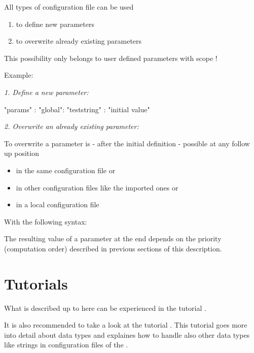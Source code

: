 All types of configuration file can be used

\begin{enumerate}
   \item to define new parameters
   \item to overwrite already existing parameters
\end{enumerate}

This possibility only belongs to user defined parameters with scope !

\vspace{2ex}

Example:

\textit{1. Define a new parameter:}

\begin{pythoncode}
"params" : {
            "global": {
                       "teststring" : "initial value"
                      }
           }
\end{pythoncode}

\vspace{2ex}

\textit{2. Overwrite an already existing parameter:}

To overwrite a parameter is - after the initial definition - possible at any follow up position

\begin{itemize}
   \item in the same configuration file or
   \item in other configuration files like the imported ones or
   \item in a local configuration file
\end{itemize}

With the following syntax:


The resulting value of a parameter at the end depends on the priority (computation order) described in previous sections of this description.

\newpage

\section{Tutorials}

What is described up to here can be experienced in the tutorial .

It is also recommended to take a look at the tutorial .
This tutorial goes more into detail about data types and explaines how to handle also other data types like strings in
configuration files of the \pkg.



